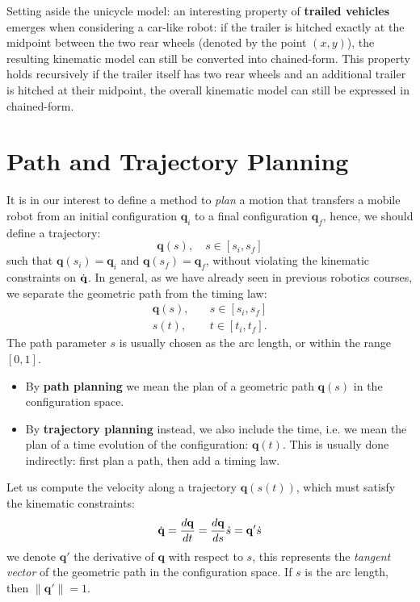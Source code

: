 \documentclass[10pt, a4paper]{report}
\newcommand{\q}{{\mathbf q}}
\begin{document}
Setting aside the unicycle model: an interesting property of \textbf{trailed vehicles} emerges when considering a car-like robot: if the trailer is hitched exactly at the midpoint between the two rear wheels (denoted by the point $(x,y)$), the resulting kinematic model can still be converted into chained-form. This property holds recursively if the trailer itself has two rear wheels and an additional trailer is hitched at their midpoint, the overall kinematic model can still be expressed in chained-form.
\section{Path and Trajectory Planning}
It is in our interest to define a method to \textit{plan} a motion that transfers a mobile robot from an initial configuration $\q_i$ to a final configuration $\q_f$, hence, we should define a trajectory:\begin{equation}
    \q(s),\quad s\in[s_i,s_f]
\end{equation}
such that $\q(s_i)=\q_i$ and $\q(s_f)=\q_f$, without violating the kinematic constraints on ${\dot{\mathbf q}}$. In general, as we have already seen in previous robotics courses, we separate the geometric path from the timing law:\begin{align}
    \q(s),\quad &s\in [s_i,s_f]\\
    s(t),\quad &t \in [t_i,t_f].
\end{align}
The path parameter $s$ is usually chosen as the arc length, or within the range $[0,1]$.\begin{itemize}
    \item By \textbf{path planning} we mean the plan of a geometric path $\q(s)$ in the configuration space.
    \item By \textbf{trajectory planning} instead, we also include the time, i.e. we mean the plan of a time evolution of the configuration: $\q(t)$. This is usually done indirectly: first plan a path, then add a timing law.
\end{itemize}
Let us compute the velocity along a trajectory $\q(s(t))$, which must satisfy the kinematic constraints:\begin{equation}
    \dq=\frac{d\q}{dt}=\frac{d\q}{ds}\dot s = \q'\dot s
\end{equation}
we denote $\q'$ the derivative of $\q$ with respect to $s$, this represents the \textit{tangent vector} of the geometric path in the configuration space. If $s$ is the arc length, then $\| \q'\|=1$.\bigskip
\end{document}
